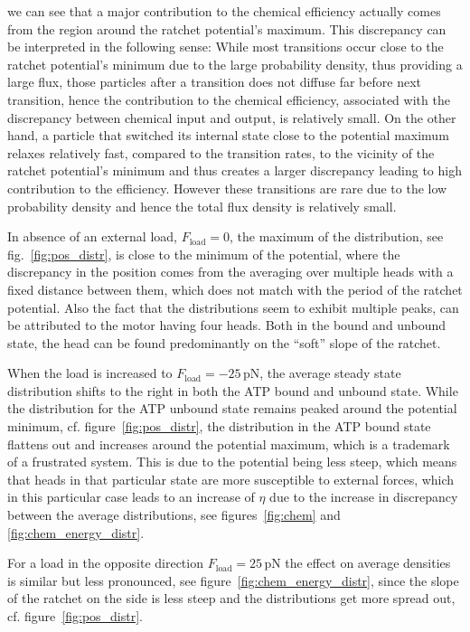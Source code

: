 \documentclass[aps,pre,twocolumn,showpacs,showkeys,superscriptaddress,floatfix]{revtex4-1}
\begin{document}
we can see that a major contribution to the chemical efficiency actually comes from the region around the ratchet potential's maximum.
This discrepancy can be interpreted in the following sense: 
While most transitions occur close to the ratchet potential's minimum due to the large probability density, thus providing a large flux, 
those particles after a transition does not diffuse far before next transition, 
hence the contribution to the chemical efficiency, associated with the discrepancy between chemical input and output, is relatively small. 
On the other hand, a particle that switched its internal state close to the potential maximum relaxes relatively fast, compared to the transition rates, 
to the vicinity of the ratchet potential's minimum and thus creates a larger discrepancy leading to high contribution to the efficiency. 
However these transitions are rare due to the low probability density and hence the total flux density is relatively small.  

In absence of an external load, $F_\text{load}=0$, 
the maximum of the distribution, see fig.~\ref{fig:pos_distr}, is close to the minimum of the potential,  
where the discrepancy in the position comes from the averaging over multiple heads with a fixed distance between them, 
which does not match with the period of the ratchet potential. 
Also the fact that the distributions seem to exhibit multiple peaks, can be attributed to the motor having four heads. 
Both in the bound and unbound state, the head can be found predominantly on the ``soft'' slope of the ratchet.

When the load is increased to $F_\text{load} = - 25 \, \mathrm{pN}$, the average steady state distribution shifts to the right in both the ATP bound and unbound state. 
While the distribution for the ATP unbound state remains peaked around the potential minimum, cf. figure~\ref{fig:pos_distr},
the distribution in the ATP bound state flattens out and increases around the potential maximum,
which is a trademark of a frustrated system.  
This is due to the potential being less steep, which means that heads in that particular state are more susceptible to external forces,  
which in this particular case leads to an increase of $\eta$ due to the increase in discrepancy between the average distributions, 
see figures~\ref{fig:chem} and \ref{fig:chem_energy_distr}. 

For a load in the opposite direction $F_\text{load}= 25 \, \mathrm{pN}$ the effect on average densities is similar but less pronounced, 
see figure~\ref{fig:chem_energy_distr}, 
since the slope of the ratchet on the side is less steep and the distributions get more spread out, cf. figure~\ref{fig:pos_distr}. 
\end{document}
